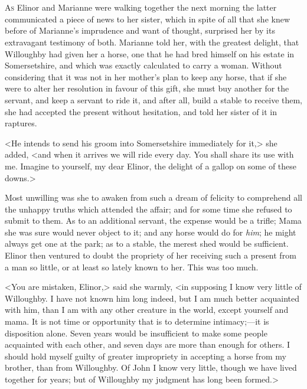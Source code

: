 \chapter[Chapter \thechapter]{}
\lettrine[lraise=0.3]{A}{s} Elinor and Marianne were walking together the next morning the latter communicated a piece of news to her sister, which in spite of all that she knew before of Marianne's imprudence and want of thought, surprised her by its extravagant testimony of both. Marianne told her, with the greatest delight, that Willoughby had given her a horse, one that he had bred himself on his estate in Somersetshire, and which was exactly calculated to carry a woman. Without considering that it was not in her mother's plan to keep any horse, that if she were to alter her resolution in favour of this gift, she must buy another for the servant, and keep a servant to ride it, and after all, build a stable to receive them, she had accepted the present without hesitation, and told her sister of it in raptures.

<He intends to send his groom into Somersetshire immediately for it,> she added, <and when it arrives we will ride every day. You shall share its use with me. Imagine to yourself, my dear Elinor, the delight of a gallop on some of these downs.>

Most unwilling was she to awaken from such a dream of felicity to comprehend all the unhappy truths which attended the affair; and for some time she refused to submit to them. As to an additional servant, the expense would be a trifle; Mama she was sure would never object to it; and any horse would do for \textit{him}; he might always get one at the park; as to a stable, the merest shed would be sufficient. Elinor then ventured to doubt the propriety of her receiving such a present from a man so little, or at least so lately known to her. This was too much.

<You are mistaken, Elinor,> said she warmly, <in supposing I know very little of Willoughby. I have not known him long indeed, but I am much better acquainted with him, than I am with any other creature in the world, except yourself and mama. It is not time or opportunity that is to determine intimacy;—it is disposition alone. Seven years would be insufficient to make some people acquainted with each other, and seven days are more than enough for others. I should hold myself guilty of greater impropriety in accepting a horse from my brother, than from Willoughby. Of John I know very little, though we have lived together for years; but of Willoughby my judgment has long been formed.>

